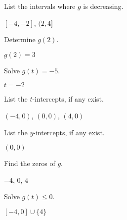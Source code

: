 \documentclass{ximera}
\begin{document}
\begin{problem}
List the intervals where $g$ is decreasing.

\begin{solution}
$[-4, -2]$, $(2,4]$
\end{solution}

\end{problem}

\begin{problem}
Determine $g(2)$.
\begin{solution}
$g(2) = 3$

\end{solution}

\end{problem}

\begin{problem}
Solve $g(t) = -5$.

\begin{solution}
$t=-2$
\end{solution}

\end{problem}

\begin{problem}
List the $t$-intercepts, if any exist.
\begin{solution}
$(-4,0)$, $(0,0)$, $(4,0)$
\end{solution}

\end{problem}

\begin{problem}
List the $y$-intercepts, if any exist.

\begin{solution}
$(0,0)$

\end{solution}

\end{problem}

\begin{problem}
Find the zeros of $g$.
\begin{solution}
$-4$, $0$, $4$
\end{solution}

\end{problem}

\begin{problem}
Solve $g(t) \leq 0$.

\begin{solution}
$[-4,0] \cup \{4\}$
\end{solution}

\end{problem}
\end{document}
